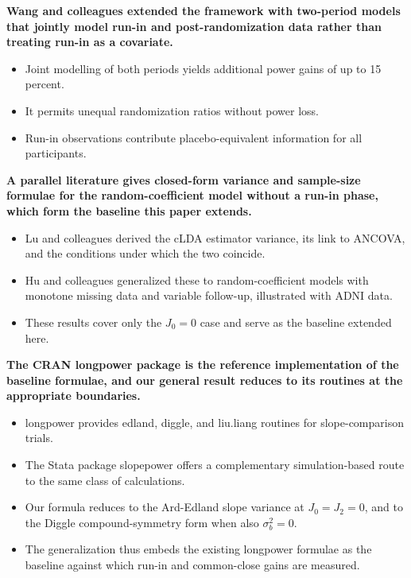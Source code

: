 \documentclass[
  11pt,
]{article}
\begin{document}
\textbf{Wang and colleagues extended the framework with two-period models that jointly model run-in and post-randomization data rather than treating run-in as a covariate.}

\begin{itemize}\setlength{\itemsep}{2pt}\setlength{\parskip}{0pt}
\item Joint modelling of both periods yields additional power gains of up to 15 percent.
\item It permits unequal randomization ratios without power loss.
\item Run-in observations contribute placebo-equivalent information for all participants.
\end{itemize}

\textbf{A parallel literature gives closed-form variance and sample-size formulae for the random-coefficient model without a run-in phase, which form the baseline this paper extends.}

\begin{itemize}\setlength{\itemsep}{2pt}\setlength{\parskip}{0pt}
\item Lu and colleagues derived the cLDA estimator variance, its link to ANCOVA, and the conditions under which the two coincide.
\item Hu and colleagues generalized these to random-coefficient models with monotone missing data and variable follow-up, illustrated with ADNI data.
\item These results cover only the $J_0 = 0$ case and serve as the baseline extended here.
\end{itemize}

\textbf{The CRAN longpower package is the reference implementation of the baseline formulae, and our general result reduces to its routines at the appropriate boundaries.}

\begin{itemize}\setlength{\itemsep}{2pt}\setlength{\parskip}{0pt}
\item longpower provides edland, diggle, and liu.liang routines for slope-comparison trials.
\item The Stata package slopepower offers a complementary simulation-based route to the same class of calculations.
\item Our formula reduces to the Ard-Edland slope variance at $J_0 = J_2 = 0$, and to the Diggle compound-symmetry form when also $\sigma_b^2 = 0$.
\item The generalization thus embeds the existing longpower formulae as the baseline against which run-in and common-close gains are measured.
\end{itemize}
\end{document}
